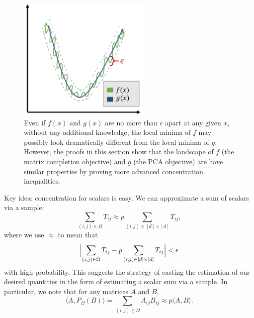 \begin{figure}
    \centering
    \includegraphics[width=2.5in]{figures/matrix-completion-f-g.png}
    \caption{Even if $f(x)$ and $g(x)$ are no more than $\epsilon$ apart at any given $x$, without any additional knowledge, the local minima of $f$ may possibly look dramatically different from the local minima of $g$. However, the proofs in this section show that the landscape of $f$ (the matrix completion objective) and $g$ (the PCA objective) are have similar properties by proving more advanced concentration inequalities. }
    \label{lec11:fig:matrix_completion_f_g}
\end{figure}

\begin{remark}
Key idea: concentration for scalars is easy. We can approximate a sum of scalars via a sample:
\begin{equation}
\sum_{(i,j) \in \Omega} T_{ij} \approx p\sum_{(i,j) \in [d]\times[d]} T_{ij},
\end{equation}
where we use $\approx$ to mean that
\begin{equation}
\Bigl| \sum_{(i,j) \in \Omega} T_{ij} - p\sum_{(i,j) \in [d]\times[d]} T_{ij} \Bigr| < \epsilon
\end{equation}
with high probability. This suggests the strategy of casting the estimation of our desired quantities in the form of estimating a scalar sum via a sample. In particular, we note that for any matrices $A$ and $B$,
\begin{equation}
\langle A, P_\Omega(B) \rangle = \sum_{(i,j) \in \Omega} A_{ij}B_{ij} \approx p\langle A, B \rangle.
\end{equation}
\end{remark}

